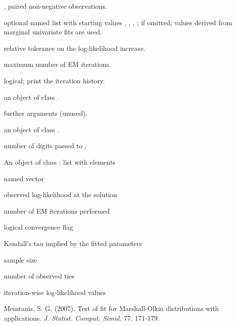 \documentclass[11pt,a4paper]{article}
\begin{document}
\begin{Arguments}
\begin{ldescription}
\item[\code{z1}, \code{z2}] paired non-negative observations.

\item[\code{start}] optional named list with starting values
, , , ; if
omitted, values derived from marginal univariate fits are used.

\item[\code{tol}] relative tolerance on the log-likelihood increase.

\item[\code{maxit}] maximum number of EM iterations.

\item[\code{verbose}] logical; print the iteration history.

\item[\code{object}] an object of class .

\item[\code{...}] further arguments (unused).

\item[\code{x}] an object of class .

\item[\code{digits}] number of digits passed to .
\end{ldescription}
\end{Arguments}
%
\begin{Value}
An object of class : list with elements
\begin{ldescription}
\item[\code{coefficients}] named vector 
\item[\code{loglik}] observed log-likelihood at the solution
\item[\code{iterations}] number of EM iterations performed
\item[\code{converged}] logical convergence flag
\item[\code{tau}] Kendall's tau implied by the fitted parameters
\item[\code{n}] sample size
\item[\code{n\_ties}] number of observed ties 
\item[\code{history}] iteration-wise log-likelihood values
\end{ldescription}
\end{Value}
%
\begin{References}
Meintanis, S. G. (2007). Test of fit for
Marshall-Olkin distributions with applications.  \emph{J. Statist.
Comput. Simul.} 77, 171-179.
\end{References}
%
\end{document}
